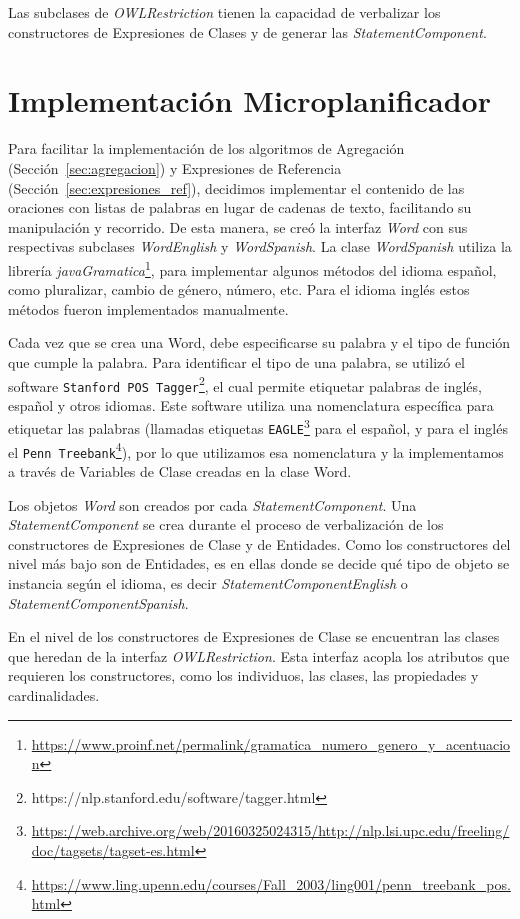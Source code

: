 Las subclases de \emph{OWLRestriction} tienen la capacidad de verbalizar los constructores de Expresiones de Clases y de generar las \emph{StatementComponent}.



\section{Implementación Microplanificador}
Para facilitar la implementación de los algoritmos de Agregación (Sección~\ref{sec:agregacion}) y Expresiones de Referencia (Sección~\ref{sec:expresiones_ref}), decidimos implementar el contenido de las oraciones con listas de palabras en lugar de cadenas de texto, facilitando su manipulación y recorrido. De esta manera, se creó la interfaz \emph{Word} con sus respectivas subclases \emph{WordEnglish} y \emph{WordSpanish}. 
La clase \emph{WordSpanish} utiliza la librería \emph{javaGramatica}\footnote{\url{https://www.proinf.net/permalink/gramatica_numero_genero_y_acentuacion}}, para implementar algunos métodos del idioma español, como pluralizar, cambio de género, número, etc. Para el idioma inglés estos métodos fueron implementados manualmente.

Cada vez que se crea una Word, debe especificarse su palabra y el tipo de función que cumple la palabra. Para identificar el tipo de una palabra, se utilizó el software \texttt{Stanford POS Tagger}\footnote{https://nlp.stanford.edu/software/tagger.html}, el cual permite etiquetar palabras de inglés, español y otros idiomas. Este software utiliza una nomenclatura específica para etiquetar las palabras (llamadas etiquetas \texttt{EAGLE}\footnote{\url{https://web.archive.org/web/20160325024315/http://nlp.lsi.upc.edu/freeling/doc/tagsets/tagset-es.html}} para el español, y para el inglés el \texttt{Penn Treebank}\footnote{\url{https://www.ling.upenn.edu/courses/Fall_2003/ling001/penn_treebank_pos.html}}), por lo que utilizamos esa nomenclatura y la implementamos a través de Variables de Clase creadas en la clase Word.

Los objetos \emph{Word} son creados por cada \emph{StatementComponent}. Una \emph{StatementComponent} se crea durante el proceso de verbalización de los constructores de Expresiones de Clase y de Entidades. Como los constructores del nivel más bajo son de Entidades, es en ellas donde se decide qué tipo de objeto se instancia según el idioma, es decir \emph{StatementComponentEnglish} o \emph{StatementComponentSpanish}. 

En el nivel de los constructores de Expresiones de Clase se encuentran las clases que heredan de la interfaz \emph{OWLRestriction}. Esta interfaz acopla los atributos que requieren los constructores, como los individuos, las clases, las propiedades y cardinalidades.

